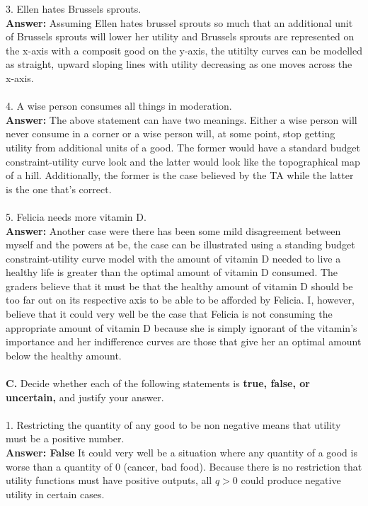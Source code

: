 \documentclass[11pt]{article}
\begin{document}
3. Ellen hates Brussels sprouts.\\
\textbf{Answer: }Assuming Ellen hates brussel sprouts so much that an additional unit of Brussels sprouts will lower her utility and Brussels sprouts are represented on the x-axis with a composit good on the y-axis, the utitilty curves can be modelled as straight, upward sloping lines with utility decreasing as one moves across the x-axis.\\
\\
4. A wise person consumes all things in moderation.\\
\textbf{Answer: }The above statement can have two meanings. Either a wise person will never consume in a corner or a wise person will, at some point, stop getting utility from additional units of a good. The former would have a standard budget constraint-utility curve look and the latter would look like the topographical map of a hill. Additionally, the former is the case believed by the TA while the latter is the one that's correct.\\
\\
5. Felicia needs more vitamin D.\\
\textbf{Answer: }Another case were there has been some mild disagreement between myself and the powers at be, the case can be illustrated using a standing budget constraint-utility curve model with the amount of vitamin D needed to live a healthy life is greater than the optimal amount of vitamin D consumed. The graders believe that it must be that the healthy amount of vitamin D should be too far out on its respective axis to be able to be afforded by Felicia. I, however, believe that it could very well be the case that Felicia is not consuming the appropriate amount of vitamin D because she is simply ignorant of the vitamin's importance and her indifference curves are those that give her an optimal amount below the healthy amount.\\
\\
\textbf{C.} Decide whether each of the following statements is \textbf{true, false, or uncertain,} and justify your answer.\\
\\
1. Restricting the quantity of any good to be non negative means that utility must be a positive number.\\
\textbf{Answer: False }It could very well be a situation where any quantity of a good is worse than a quantity of 0 (cancer, bad food). Because there is no restriction that utility functions must have positive outputs, all $q > 0$ could produce negative utility in certain cases.\\
\end{document}
